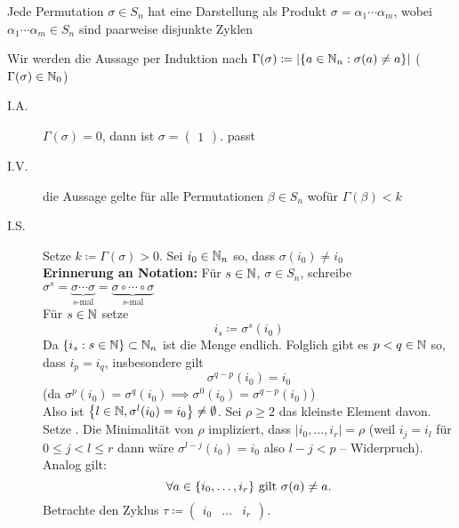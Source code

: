 \begin{subtheorem}
	Jede Permutation $ \sigma \in S_n $ hat eine Darstellung als Produkt $ \sigma = \alpha_1 \dotsb \alpha_m $, wobei $ \alpha_1 \dotsb \alpha_m \in S_n $ sind paarweise disjunkte Zyklen
\end{subtheorem}
\begin{subproof*}
	Wir werden die Aussage per Induktion nach $ \Gamma(\sigma) \coloneqq \left| \left\{ a \in \mathbb{N} _n : \sigma (a) \neq a \right\}  \right|  $
	($ \Gamma(\sigma) \in \mathbb{N} _0 $)
	\begin{description}
		\item[I.A.] $ \Gamma(\sigma) = 0 $, dann ist $ \sigma = \begin{pmatrix} 1 \end{pmatrix}  $. passt
		\item[I.V.] die Aussage gelte für alle Permutationen $ \beta \in S_n $ wofür $ \Gamma(\beta) < k $
		\item[I.S.] Setze $ k \coloneqq \Gamma(\sigma) > 0$.
			Sei $ i_0 \in \mathbb{N} _n $ so, dass $ \sigma(i_0) \neq i_0 $\\
			\textbf{Erinnerung an Notation:} Für $ s \in \mathbb{N}  $, $ \sigma \in S_n $, schreibe $ \sigma^s = \underbrace{\sigma \dotsb \sigma}_{s\text{-mal} } = \underbrace{\sigma \circ \dotsb \circ \sigma}_{s\text{-mal} } $\\
			Für $ s \in \mathbb{N}  $ setze
			\[
				i_s \coloneqq \sigma^s(i_0)
			\]
			Da $ \left\{ i_s : s \in \mathbb{N}  \right\} \subset \mathbb{N} _n $ ist die Menge endlich.
			Folglich gibt es $ p < q \in \mathbb{N}  $ so, dass $ i_p = i_q $, insbesondere gilt
			\[
				\sigma^{q - p} (i_0) = i_0
			\]
			(da $ \sigma^p(i_0) = \sigma^q(i_0) \implies \sigma^0(i_0) = \sigma ^{q - p} (i_0) $) \\
			Also ist $ \left\{ l \in \mathbb{N} , \sigma^{l} (i_0) = i_0 \right\} \neq \emptyset  $.
			Sei $ \rho \geq 2 $ das kleinste Element davon.
			Setze .
			Die Minimalität von $ \rho $ impliziert, dass $ \left| i_0, \dotsc, i_r \right| = \rho $ (weil $ i_j = i_l $ für $ 0 \leq j < l \leq r $ dann wäre $ \sigma^{l - j} (i_0) = i_0 $ also $ l - j < p $ -- Widerpruch).
			Analog gilt: 
			\begin{equation}
				\label{eq:2.11.8.1}
				\forall a \in \left\{ i_0, \dotsc, i_r \right\}  $ gilt $ \sigma (a) \neq a.
			\end{equation}
			Betrachte den Zyklus $ \tau \coloneqq \begin{pmatrix} i_0 & \dotsc & i_r \end{pmatrix}  $.

\end{description}
\end{subproof*}
